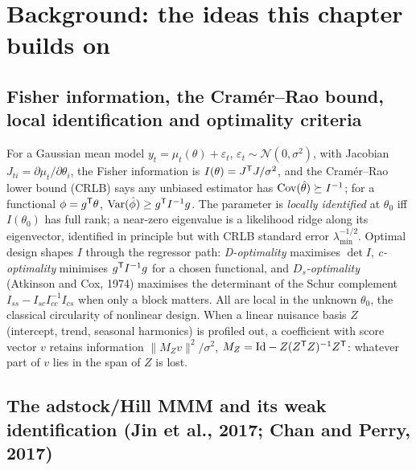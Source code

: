 \section{Background: the ideas this chapter builds on}

\subsection{Fisher information, the Cram\'er--Rao bound, local identification and optimality criteria}

For a Gaussian mean model $y_t = \mu_t(\theta) + \varepsilon_t$, $\varepsilon_t \sim \mathcal N(0, \sigma^2)$, with Jacobian $J_{ti} = \partial\mu_t/\partial\theta_i$, the Fisher information is $I(\theta) = J^{\mathsf{T}} J/\sigma^2$, and the Cram\'er--Rao lower bound (CRLB) says any unbiased estimator has $\operatorname{Cov}(\hat\theta) \succeq I^{-1}$; for a functional $\phi = g^{\mathsf{T}}\theta$, $\operatorname{Var}(\hat\phi) \ge g^{\mathsf{T}} I^{-1}g$. The parameter is \emph{locally identified} at $\theta_0$ iff $I(\theta_0)$ has full rank; a near-zero eigenvalue is a likelihood ridge along its eigenvector, identified in principle but with CRLB standard error $\lambda_{\min}^{-1/2}$. Optimal design shapes $I$ through the regressor path: \emph{D-optimality} maximises $\det I$, \emph{c-optimality} minimises $g^{\mathsf{T}} I^{-1}g$ for a chosen functional, and \emph{$D_s$-optimality} (Atkinson and Cox, 1974) maximises the determinant of the Schur complement $I_{ss} - I_{sc}I_{cc}^{-1}I_{cs}$ when only a block matters. All are local in the unknown $\theta_0$, the classical circularity of nonlinear design. When a linear nuisance basis $Z$ (intercept, trend, seasonal harmonics) is profiled out, a coefficient with score vector $v$ retains information $\|M_Z v\|^2/\sigma^2$, $M_Z = \mathrm{Id} - Z(Z^{\mathsf{T}} Z)^{-1}Z^{\mathsf{T}}$: whatever part of $v$ lies in the span of $Z$ is lost.

\subsection{The adstock/Hill MMM and its weak identification (Jin et al., 2017; Chan and Perry, 2017)}

